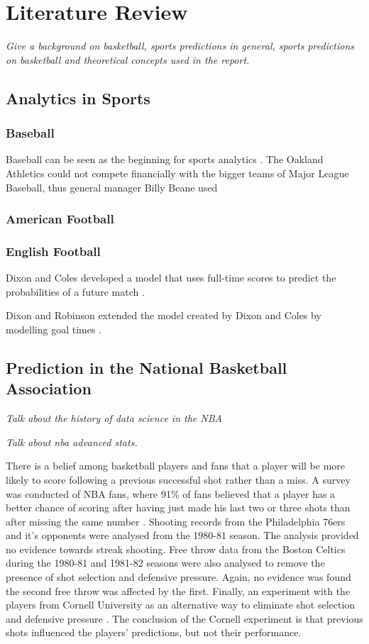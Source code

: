 \chapter{Literature Review}\label{chapter:background}

\textit{Give a background on basketball, sports predictions in general, sports predictions on basketball and theoretical concepts used in the report.}

\section{Analytics in Sports}


\subsection{Baseball}
Baseball can be seen as the beginning for sports analytics \citep{moneyball}.  The Oakland Athletics could not compete financially with the bigger teams of Major League Baseball, thus general manager Billy Beane used 
\subsection{American Football}

\subsection{English Football}
Dixon and Coles developed a model that uses full-time scores to predict the probabilities of a future match \citep{dixon_coles}.

Dixon and Robinson extended the model created by Dixon and Coles by modelling goal times \citep{dixon_robinson}.

\section{Prediction in the National Basketball Association}
\textit{Talk about the history of data science in the NBA}

\textit{Talk about nba advanced stats.}

There is a belief among basketball players and fans that a player will be more likely to score following a previous successful shot rather than a miss.  A survey was conducted of NBA fans, where 91\% of fans believed that a player has a better chance of scoring after having just made his last two or three shots than after missing the same number \citep{nba_hot_hand}.  Shooting records from the Philadelphia 76ers and it's opponents were analysed from the 1980-81 season.   The analysis provided no evidence towards streak shooting.  Free throw data from the Boston Celtics during the 1980-81 and 1981-82 seasons were also analysed to remove the presence of shot selection and defensive pressure.  Again, no evidence was found the second free throw was affected by the first.  Finally, an experiment with the players from Cornell University as an alternative way to eliminate shot selection and defensive pressure \citep{nba_hot_hand}.  The conclusion of the Cornell experiment is that previous shots 
influenced the players' predictions, but not their performance.  

